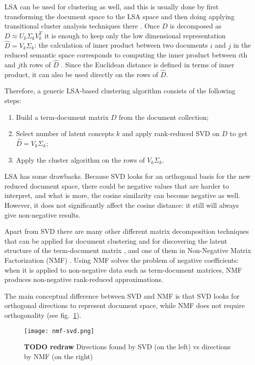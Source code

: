 LSA can be used for clustering as well, and this is usually done
by first transforming the document space to the LSA space
and then doing applying transitional cluster analysis techniques
there \cite{schutze1997projections}.
Once $D$ is decomposed as $D \approx U_k \Sigma_k V_k^T$
it is enough to keep only the low dimensional representation $\hat D = V_k \Sigma_k$:
the calculation of inner product between two documents $i$ and $j$ in
the reduced semantic  space corresponds to computing the inner product
between $i$th and $j$th rows of $\hat D$ \cite{deerwester1990indexing}. Since the
Euclidean distance is defined in terms of inner product, it can also be used
directly on the rows of $\hat D$.

Therefore, a generic LSA-based clustering algorithm consists of the following steps:

\begin{enumerate}
\itemsep1pt\parskip0pt
  \item Build a term-document matrix $D$ from the document collection;
  \item Select number of latent concepts $k$ and apply rank-reduced SVD on $D$
      to get $\hat D= V_k \Sigma_k$;
  \item Apply the cluster algorithm on the rows of $V_k \Sigma_k$.
\end{enumerate}


LSA has some drawbacks. Because SVD looks for an orthogonal basis for the new
reduced document space, there could be negative values that are harder
to interpret, and what is more, the cosine similarity can become negative as well.
However, it does not significantly affect the cosine distance: it still
will always give non-negative results.

Apart from SVD there are many other different matrix decomposition
techniques that can be applied for document clustering and for discovering
the latent structure of the term-document matrix \cite{osinski2006improving},
and one of them in Non-Negative Matrix Factorization (NMF) \cite{lee1999nnmf}.
Using NMF solves the problem of negative coefficients:
when it is applied to non-negative data such as term-document matrices,
NMF produces non-negative rank-reduced approximations.

The main conceptual difference between SVD and NMF is that SVD looks for
orthogonal directions to represent document space, while NMF does not
require orthogonality \cite{xu2003document} (see fig.~\ref{fig:nmf-svd}).


\begin{figure}[h]
\centering\texttt{[image: nmf-svd.png]}
\caption{\textbf{TODO redraw} Directions found by  SVD (on the left) vs directions by NMF (on the right)}
\label{fig:nmf-svd}
\end{figure}


